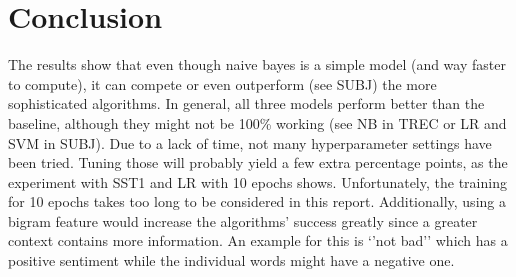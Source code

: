 \documentclass[11pt]{article}
\begin{document}
\section{Conclusion}

The results show that even though naive bayes is a simple model (and way faster to compute), it can compete or even outperform (see SUBJ) the more sophisticated algorithms. In general, all three models perform better than the baseline, although they might not be 100\% working (see NB in TREC or LR and SVM in SUBJ). Due to a lack of time, not many hyperparameter settings have been tried. 
Tuning those will probably yield a few extra percentage points, as the experiment with SST1 and LR with 10 epochs shows. Unfortunately, the training for 10 epochs takes too long to be considered in this report. Additionally, using a bigram feature would increase the algorithms' success greatly since a greater context contains more information. An example for this is `'not bad'' which has a positive sentiment while the individual words might have a negative one.





\end{document}
